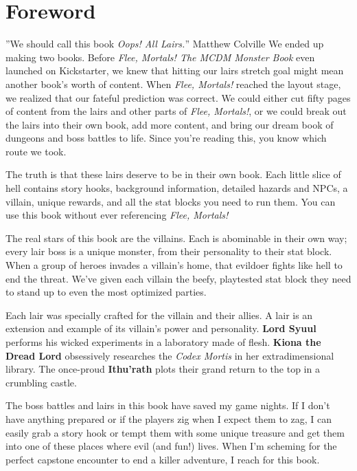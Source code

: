 \documentclass[10pt,a4paper,twoside,bg=print,twocolumn,openany,nodeprecatedcode]{dndbook}
\date{}
\begin{document}
\frontmatter
\tableofcontents
\mainmatter
\chapter{Foreword}
\DndQuote%
{}
{''We should call this book \textit{Oops! All Lairs.}''}
{Matthew Colville}
We ended up making two books. Before \textit{Flee, Mortals! The MCDM Monster Book} even launched on Kickstarter, we knew that hitting our lairs stretch goal might mean another book's worth of content. When \textit{Flee, Mortals!} reached the layout stage, we realized that our fateful prediction was correct. We could either cut fifty pages of content from the lairs and other parts of \textit{Flee, Mortals!}, or we could break out the lairs into their own book, add more content, and bring our dream book of dungeons and boss battles to life. Since you're reading this, you know which route we took.

The truth is that these lairs deserve to be in their own book. Each little slice of hell contains story hooks, background information, detailed hazards and NPCs, a villain, unique rewards, and all the stat blocks you need to run them. You can use this book without ever referencing \textit{Flee, Mortals!}

The real stars of this book are the villains. Each is abominable in their own way; every lair boss is a unique monster, from their personality to their stat block. When a group of heroes invades a villain's home, that evildoer fights like hell to end the threat. We've given each villain the beefy, playtested stat block they need to stand up to even the most optimized parties.

Each lair was specially crafted for the villain and their allies. A lair is an extension and example of its villain's power and personality. \textbf{Lord Syuul} performs his wicked experiments in a laboratory made of flesh. \textbf{Kiona the Dread Lord} obsessively researches the \textit{Codex Mortis} in her extradimensional library. The once-proud \textbf{Ithu'rath} plots their grand return to the top in a crumbling castle.

The boss battles and lairs in this book have saved my game nights. If I don't have anything prepared or if the players zig when I expect them to zag, I can easily grab a story hook or tempt them with some unique treasure and get them into one of these places where evil (and fun!) lives. When I'm scheming for the perfect capstone encounter to end a killer adventure, I reach for this book.
\end{document}
